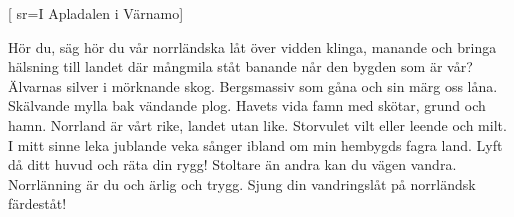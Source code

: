 
[
  sr={I Apladalen i Värnamo}]
  
\beginverse*
 Hör du, säg hör du vår norrländska låt
 över vidden klinga, manande och bringa
 hälsning till landet där mångmila ståt
 banande når den bygden som är vår?
 \endverse
 \beginverse*
 Älvarnas silver i mörknande skog.
 Bergsmassiv som gåna och sin märg oss låna.
 Skälvande mylla bak vändande plog.
 Havets vida famn med skötar, grund och hamn.
 \endverse
 Norrland är vårt rike, landet utan like.
 Storvulet vilt eller leende och milt.
 I mitt sinne leka jublande veka
 sånger ibland om min hembygds fagra land.
 \beginverse*
 Lyft då ditt huvud och räta din rygg!
 Stoltare än andra kan du vägen vandra.
 Norrlänning är du och ärlig och trygg.
 Sjung din vandringslåt på norrländsk färdeståt!
\endverse
\endsong



